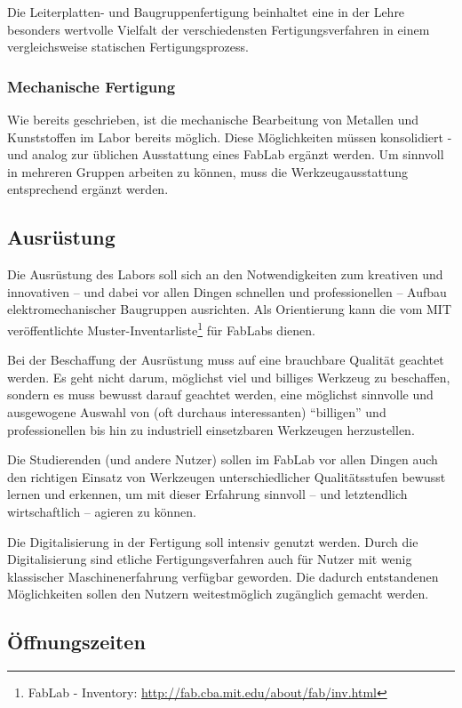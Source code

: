 \documentclass[parskip=half,headsepline,footsepline,titlepage]{scrartcl}
\begin{document}
Die Leiterplatten- und Baugruppenfertigung beinhaltet eine in der Lehre besonders wertvolle Vielfalt der verschiedensten Fertigungsverfahren in einem vergleichsweise statischen Fertigungsprozess.

\subsubsection{Mechanische Fertigung}
Wie bereits geschrieben, ist die mechanische Bearbeitung von Metallen und Kunststoffen im Labor bereits möglich. Diese Möglichkeiten müssen konsolidiert - und analog zur üblichen Ausstattung eines FabLab ergänzt werden.
Um sinnvoll in mehreren Gruppen arbeiten zu können, muss die Werkzeugausstattung entsprechend ergänzt werden.

\subsection{Ausrüstung}
Die Ausrüstung des Labors soll sich an den Notwendigkeiten zum kreativen und innovativen -- und dabei vor allen Dingen schnellen und professionellen -- Aufbau elektromechanischer Baugruppen ausrichten. Als Orientierung kann die vom MIT veröffentlichte Muster-Inventarliste\footnote{FabLab - Inventory: \url{http://fab.cba.mit.edu/about/fab/inv.html}} für FabLabs dienen. %

Bei der Beschaffung der Ausrüstung muss auf eine brauchbare Qualität geachtet werden. Es geht nicht darum, möglichst viel und billiges Werkzeug zu beschaffen, sondern es muss bewusst darauf geachtet werden, eine möglichst sinnvolle und ausgewogene Auswahl von (oft durchaus interessanten) ``billigen'' und professionellen bis hin zu industriell einsetzbaren Werkzeugen herzustellen.

Die Studierenden (und andere Nutzer) sollen im FabLab vor allen Dingen auch den richtigen Einsatz von Werkzeugen unterschiedlicher Qualitätsstufen bewusst lernen und erkennen, um mit dieser Erfahrung sinnvoll -- und letztendlich wirtschaftlich -- agieren zu können.

Die Digitalisierung in der Fertigung soll intensiv genutzt werden. Durch die Digitalisierung sind etliche Fertigungsverfahren auch für Nutzer mit wenig klassischer Maschinenerfahrung verfügbar geworden. Die dadurch entstandenen Möglichkeiten sollen den Nutzern weitestmöglich zugänglich gemacht werden.


\subsection{Öffnungszeiten}
\end{document}
